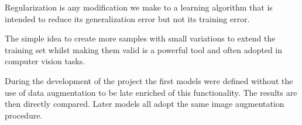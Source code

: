 Regularization is any modification we make to a learning algorithm that is intended to reduce its
generalization error but not its training error.

The simple idea to create more samples with small variations to extend the training set whilst making them valid
is a powerful tool and often adopted in computer vision tasks.


During the development of the project the first models were defined without the use of data augmentation
to be late enriched of this functionality. The results are then directly compared. Later models all adopt the same
image augmentation procedure.